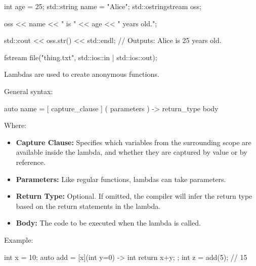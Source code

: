 \documentclass{report}
\begin{document}
     \begin{cppcode}
int age = 25;
std::string name = "Alice";
std::ostringstream oss;

oss << name << " is " << age << " years old.";

std::cout << oss.str() << std::endl; // Outputs: Alice is 25 years old.
     \end{cppcode}
     

    \pagebreak
    \bigbreak \noindent 
    \begin{cppcode}
fstream file("thing.txt", std::ios::in | std::ios::out);
    \end{cppcode}

    \pagebreak
    \bigbreak \noindent 
    \begin{concept}
       Lambdas are used to create anonymous functions. 
    \end{concept}
    \bigbreak \noindent 
    General syntax:
    \bigbreak \noindent 
    \begin{cppcode}
auto name = [ capture_clause ] ( parameters ) -> return_type { body }
    \end{cppcode}
    \bigbreak \noindent 
    Where:
    \begin{itemize}
        \item \textbf{Capture Clause:} Specifies which variables from the surrounding scope are available inside the lambda, and whether they are captured by value or by reference.
        \item \textbf{Parameters:} Like regular functions, lambdas can take parameters.
        \item \textbf{Return Type:} Optional. If omitted, the compiler will infer the return type based on the return statements in the lambda.
        \item \textbf{Body:} The code to be executed when the lambda is called.
    \end{itemize}

    \bigbreak \noindent 
    Example:
    \bigbreak \noindent 
    \begin{cppcode}
int x = 10;
auto add = [x](int y=0) -> int { return x+y; };
int z  = add(5);  // 15
    \end{cppcode}
    \bigbreak \noindent 
\end{document}
